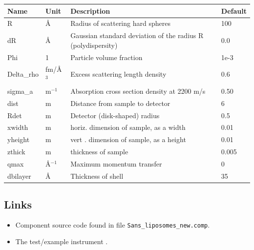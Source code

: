 \begin{longtable}{p{}p{}p{}p{}}
\toprule
\textbf{Name} & \textbf{Unit} & \textbf{Description} & \textbf{Default} \\
\midrule
\endhead
R & \AA{} & Radius of scattering hard spheres & 100 \\
dR & \AA{} & Gaussian standard deviation of the radius R (polydispersity) & 0.0 \\
Phi & 1 & Particle volume fraction & 1e-3 \\
Delta\_rho & fm/\AA{}$^{3}$ & Excess scattering length density & 0.6 \\
sigma\_a & m$^{-1}$ & Absorption cross section density at 2200 m/s & 0.50 \\
dist & m & Distance from sample to detector & 6 \\
Rdet & m & Detector (disk-shaped) radius & 0.5 \\
xwidth & m & horiz. dimension of sample, as a width & 0.01 \\
yheight & m & vert . dimension of sample, as a height & 0.01 \\
zthick & m & thickness of sample & 0.005 \\
qmax & \AA{}$^{-1}$ & Maximum momentum transfer & 0 \\
dbilayer & \AA{} & Thickness of shell & 35 \\
\bottomrule
\end{longtable}

\subsection*{Links}
\begin{itemize}
  \item Component source code found in file \texttt{Sans\_liposomes\_new.comp}.
  \item The test/example instrument .
\end{itemize}
